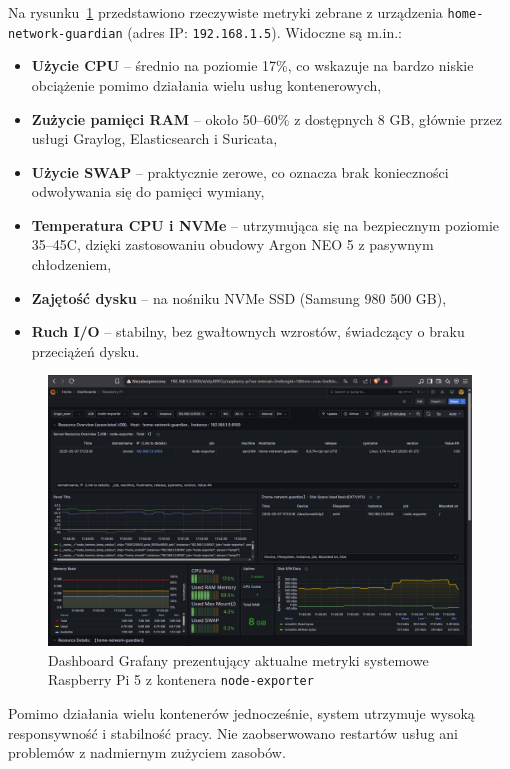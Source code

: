 \documentclass[
    left=2.5cm,         %
    right=2.5cm,        %
    top=2.5cm,          %
    bottom=3cm,         %
    bindingoffset=6mm,  %
    nohyphenation=true %
]{eiti/eiti-thesis} %
\begin{document}
Na rysunku~\ref{fig:grafana} przedstawiono rzeczywiste metryki zebrane z urządzenia \texttt{home-network-guardian} (adres IP: \texttt{192.168.1.5}). Widoczne są m.in.:
\begin{itemize}
    \item \textbf{Użycie CPU} – średnio na poziomie 17\%, co wskazuje na bardzo niskie obciążenie pomimo działania wielu usług kontenerowych,
    \item \textbf{Zużycie pamięci RAM} – około 50–60\% z dostępnych 8 GB, głównie przez usługi Graylog, Elasticsearch i Suricata,
    \item \textbf{Użycie SWAP} – praktycznie zerowe, co oznacza brak konieczności odwoływania się do pamięci wymiany,
    \item \textbf{Temperatura CPU i NVMe} – utrzymująca się na bezpiecznym poziomie 35–45\textdegree C, dzięki zastosowaniu obudowy Argon NEO 5 z pasywnym chłodzeniem,
    \item \textbf{Zajętość dysku} – na nośniku NVMe SSD (Samsung 980 500 GB),
    \item \textbf{Ruch I/O} – stabilny, bez gwałtownych wzrostów, świadczący o braku przeciążeń dysku.
\end{itemize}

\begin{figure}[H]
    \centering
    \includegraphics[width=\textwidth]{grafana.png}
    \caption{Dashboard Grafany prezentujący aktualne metryki systemowe Raspberry Pi 5 z kontenera \texttt{node-exporter}}
    \label{fig:grafana}
\end{figure}

Pomimo działania wielu kontenerów jednocześnie, system utrzymuje wysoką responsywność i stabilność pracy. Nie zaobserwowano restartów usług ani problemów z nadmiernym zużyciem zasobów.
\end{document}
